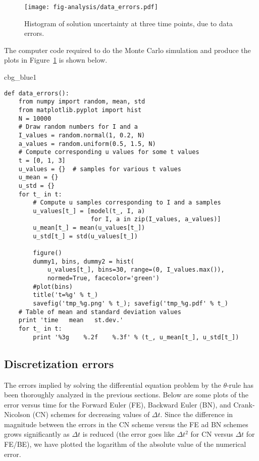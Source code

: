 \documentclass[graybox,sectrefs,envcountresetchap,open=right,final]{svmonodo}
\newenvironment{_cod_tight}[1]{
   \def\FrameCommand{\colorbox{#1}}
   \FrameRule0.6pt\MakeFramed {\FrameRestore}\vskip3mm}
   {\vskip0mm\endMakeFramed}
\newenvironment{cod}[1]{
\bgroup\rmfamily
\fboxsep=0mm\relax
\begin{_cod_tight}{#1}
\list{}{\parsep=-2mm\parskip=0mm\topsep=0pt\leftmargin=2mm
\rightmargin=2\leftmargin\leftmargin=4pt\relax}
\item\relax}
{\endlist\end{_cod_tight}\egroup}
\begin{document}
\begin{figure}[!ht]  %
  \centerline{\texttt{[image: fig-analysis/data\_errors.pdf]}}
  \caption{
  Histogram of solution uncertainty at three time points, due to data errors. \label{decay:analysis:data_errors:fig}
  }
\end{figure}


The computer code required to do the Monte Carlo simulation and
produce the plots in Figure~\ref{decay:analysis:data_errors:fig}
is shown below.

\begin{cod}{cbg_blue1}\begin{Verbatim}[numbers=none,fontsize=\fontsize{9pt}{9pt},baselinestretch=0.95,xleftmargin=2mm]
def data_errors():
    from numpy import random, mean, std
    from matplotlib.pyplot import hist
    N = 10000
    # Draw random numbers for I and a
    I_values = random.normal(1, 0.2, N)
    a_values = random.uniform(0.5, 1.5, N)
    # Compute corresponding u values for some t values
    t = [0, 1, 3]
    u_values = {}  # samples for various t values
    u_mean = {}
    u_std = {}
    for t_ in t:
        # Compute u samples corresponding to I and a samples
        u_values[t_] = [model(t_, I, a)
                        for I, a in zip(I_values, a_values)]
        u_mean[t_] = mean(u_values[t_])
        u_std[t_] = std(u_values[t_])

        figure()
        dummy1, bins, dummy2 = hist(
            u_values[t_], bins=30, range=(0, I_values.max()),
            normed=True, facecolor='green')
        #plot(bins)
        title('t=%g' % t_)
        savefig('tmp_%g.png' % t_); savefig('tmp_%g.pdf' % t_)
    # Table of mean and standard deviation values
    print 'time   mean   st.dev.'
    for t_ in t:
        print '%3g    %.2f    %.3f' % (t_, u_mean[t_], u_std[t_])
\end{Verbatim}
\end{cod}
\noindent

\subsection{Discretization errors}

The errors implied by solving the differential equation problem by
the $\theta$-rule has been thoroughly analyzed in the previous
sections. Below are some plots of the error versus time for the
Forward Euler (FE), Backward Euler (BN), and Crank-Nicolson (CN)
schemes for decreasing values of $\Delta t$. Since the difference
in magnitude between the errors in the CN scheme versus the FE ad
BN schemes grows significantly as $\Delta t$ is reduced (the error
goes like $\Delta t^2$ for CN versus $\Delta t$ for FE/BE), we have
plotted the logarithm of the absolute value of the numerical error.
\end{document}
